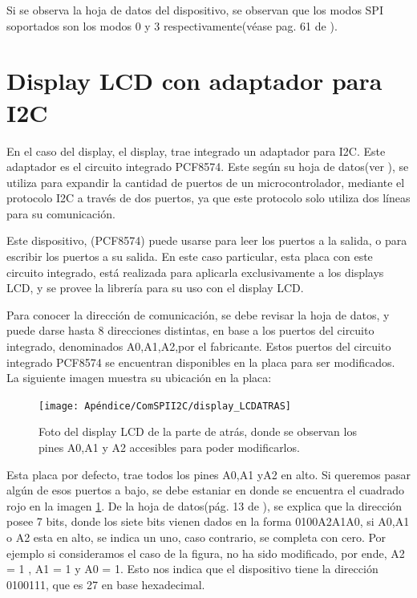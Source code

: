 Si se observa la hoja de datos del dispositivo, se observan que los modos SPI soportados son los modos 0 y 3 respectivamente(véase pag. 61 de \cite{datsheetw5100}). 


\section{Display LCD con adaptador para I2C }

En el caso del display, el display, trae integrado un adaptador para I2C. Este adaptador es el circuito integrado PCF8574. Este según su hoja de datos(ver \cite{datsheetLCD}), se utiliza para expandir la cantidad de puertos de un microcontrolador, mediante el protocolo I2C a través de dos puertos, ya que este protocolo solo utiliza dos líneas para su comunicación. 

Este dispositivo, (PCF8574) puede usarse para leer los puertos a la salida, o para escribir los puertos a su salida. En este caso particular, esta placa con este circuito integrado, está realizada para aplicarla exclusivamente a los displays LCD, y se provee la librería para su uso con el display LCD. 

Para conocer la dirección de comunicación, se debe revisar la hoja de datos, y puede darse hasta 8 direcciones distintas, en base a los puertos del circuito integrado, denominados A0,A1,A2,por el fabricante. Estos puertos del circuito integrado PCF8574 se encuentran disponibles en la placa para ser modificados. La siguiente imagen muestra su ubicación en la placa: 

\begin{figure}[ht]
	\texttt{[image: Apéndice/ComSPII2C/display\_LCDATRAS]}
	\caption{Foto del display LCD de la parte de atrás, donde se observan los pines A0,A1 y A2 accesibles para poder modificarlos.}
	\label{fig:pcf8574_LCD} 
\end{figure}

Esta placa por defecto, trae todos los pines A0,A1 yA2 en alto. Si queremos pasar algún de esos puertos a bajo, se debe estaniar en donde se encuentra el cuadrado rojo en la imagen \ref{fig:pcf8574_LCD}. De la hoja de datos(pág. 13 de \cite{datsheetLCD}), se explica que la dirección posee 7 bits, donde los siete bits vienen dados en la forma 0100A2A1A0, si A0,A1 o A2 esta en alto, se indica un uno, caso contrario, se completa con cero. Por ejemplo si consideramos el caso de la figura, no ha sido modificado, por ende, A2 = 1 , A1 = 1 y A0 = 1. Esto nos indica que el dispositivo tiene la dirección 0100111, que es 27 en base hexadecimal. 


